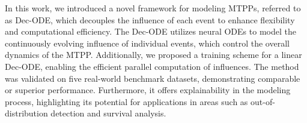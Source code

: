In this work, we introduced a novel framework for modeling MTPPs, referred to as Dec-ODE, which decouples the influence of each event to enhance flexibility and computational efficiency. The Dec-ODE utilizes neural ODEs to model the continuously evolving influence of individual events, which control the overall dynamics of the MTPP. Additionally, we proposed a training scheme for a linear Dec-ODE, enabling the efficient parallel computation of influences. The method was validated on five real-world benchmark datasets, demonstrating comparable or superior performance. Furthermore, it offers explainability in the modeling process, highlighting its potential for applications in areas such as out-of-distribution detection and survival analysis.
